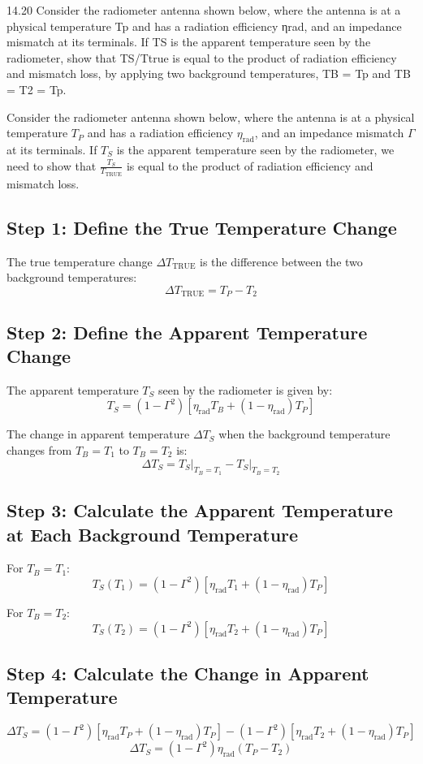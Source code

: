 \documentclass[cn,12pt]{homework}
\begin{document}
14.20 Consider the radiometer antenna shown below, where the antenna is at a physical temperature Tp
and has a radiation efficiency ηrad, and an impedance mismatch  at its terminals. If TS is the apparent temperature seen by the radiometer, show that  TS/Ttrue is equal to the product of radiation efficiency and mismatch loss, by applying two background temperatures, TB = Tp and TB =
T2 	= Tp.   
\begin{solution}
  Consider the radiometer antenna shown below, where the antenna is at a physical temperature \( T_P \) and has a radiation efficiency \( \eta_{\text{rad}} \), and an impedance mismatch \( \Gamma \) at its terminals. If \( T_S \) is the apparent temperature seen by the radiometer, we need to show that \( \frac{T_S}{T_{\text{TRUE}}} \) is equal to the product of radiation efficiency and mismatch loss.

\subsection*{Step 1: Define the True Temperature Change}
The true temperature change \( \Delta T_{\text{TRUE}} \) is the difference between the two background temperatures:
\[ \Delta T_{\text{TRUE}} = T_P - T_2 \]

\subsection*{Step 2: Define the Apparent Temperature Change}
The apparent temperature \( T_S \) seen by the radiometer is given by:
\[ T_S = (1-\Gamma^2)\left[\eta_{\text{rad}} T_B + (1-\eta_{\text{rad}})T_P\right] \]

The change in apparent temperature \( \Delta T_S \) when the background temperature changes from \( T_B = T_1 \) to \( T_B = T_2 \) is:
\[ \Delta T_S = T_S\bigg|_{T_B=T_1} - T_S\bigg|_{T_B=T_2} \]

\subsection*{Step 3: Calculate the Apparent Temperature at Each Background Temperature}
For \( T_B = T_1 \):
\[ T_S(T_1) = (1 - \Gamma^2) \left[ \eta_{\text{rad}} T_1 + (1 - \eta_{\text{rad}}) T_P \right] \]

For \( T_B = T_2 \):
\[ T_S(T_2) = (1 - \Gamma^2) \left[ \eta_{\text{rad}} T_2 + (1 - \eta_{\text{rad}}) T_P \right] \]

\subsection*{Step 4: Calculate the Change in Apparent Temperature}
\[ \Delta T_S = (1-\Gamma^2)\left[\eta_{\text{rad}} T_P + (1-\eta_{\text{rad}}) T_P\right] - (1-\Gamma^2)\left[\eta_{\text{rad}} T_2 + (1-\eta_{\text{rad}}) T_P\right] \]
\[ \Delta T_S = (1-\Gamma^2) \eta_{\text{rad}} (T_P - T_2) \]


\end{solution}
\end{document}
